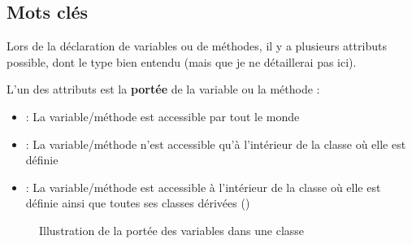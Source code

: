 \documentclass[a4paper,twoside]{article}
\begin{document}
\subsection{Mots clés}
Lors de la déclaration de variables ou de méthodes, il y a plusieurs attributs possible, dont le type bien entendu (mais que je ne détaillerai pas ici). 

\bigskip

L'un des attributs est la \textbf{portée} de la variable ou la méthode :
\begin{itemize}
\item {} : La variable/méthode est accessible par tout le monde
\item {} : La variable/méthode n'est accessible qu'à l'intérieur de la classe où elle est définie
\item {} : La variable/méthode est accessible à l'intérieur de la classe où elle est définie ainsi que toutes ses classes dérivées ()
\end{itemize}

\begin{figure}[htb]
\centering
{}\hfill
{}\hfill
{}
\caption{Illustration de la portée des variables dans une classe}\label{fig:portee}
\end{figure}
\end{document}
